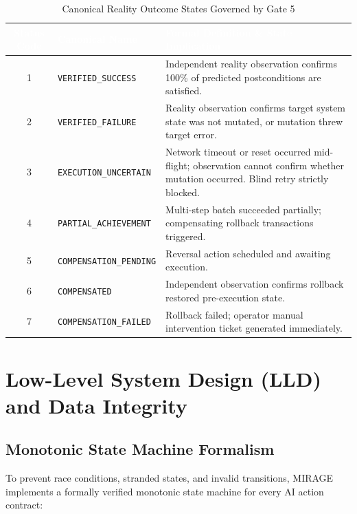 \documentclass[11pt,a4paper]{article}
\newcommand{\hc}[1]{\textcolor{white}{\textbf{#1}}}
\newcommand{\hdrrow}{\rowcolor{primarynavy}}
\begin{document}
\begin{table}[!htbp]
\centering
\small
\caption{Canonical Reality Outcome States Governed by Gate 5}
\label{tab:outcome_states}
\begin{tabularx}{\linewidth}{@{}cL{4.2cm}Y@{}}
\toprule
\hdrrow \hc{Status Code} & \hc{Canonical Name} & \hc{Formal Definition \& State Implication} \\
 & \texttt{VERIFIED\_SUCCESS} & Independent reality observation confirms 100\% of predicted postconditions are satisfied. \\
2 & \texttt{VERIFIED\_FAILURE} & Reality observation confirms target system state was not mutated, or mutation threw target error. \\
3 & \texttt{EXECUTION\_UNCERTAIN} & Network timeout or reset occurred mid-flight; observation cannot confirm whether mutation occurred. Blind retry strictly blocked. \\
4 & \texttt{PARTIAL\_ACHIEVEMENT} & Multi-step batch succeeded partially; compensating rollback transactions triggered. \\
5 & \texttt{COMPENSATION\_PENDING} & Reversal action scheduled and awaiting execution. \\
6 & \texttt{COMPENSATED} & Independent observation confirms rollback restored pre-execution state. \\
7 & \texttt{COMPENSATION\_FAILED} & Rollback failed; operator manual intervention ticket generated immediately. \\
\bottomrule
\end{tabularx}
\end{table}

\section{Low-Level System Design (LLD) and Data Integrity}

\subsection{Monotonic State Machine Formalism}
To prevent race conditions, stranded states, and invalid transitions, MIRAGE implements a formally verified monotonic state machine for every AI action contract:
\end{document}
